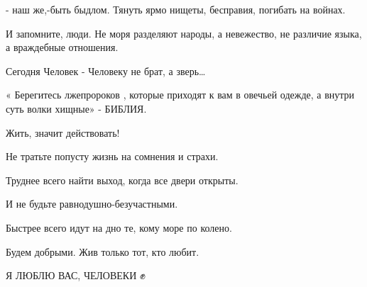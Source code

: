 - наш  же,-быть быдлом.  Тянуть ярмо нищеты, бесправия, погибать на войнах.

И запомните, люди. Не моря разделяют народы, а невежество, не различие языка,
а враждебные отношения. 

Сегодня Человек - Человеку не брат, а зверь…

\obeycr
« Берегитесь лжепророков , 
которые приходят к вам в овечьей одежде, 
а внутри суть волки хищные» - БИБЛИЯ.
\restorecr

Жить, значит действовать! 

Не тратьте попусту жизнь на сомнения и страхи.

Труднее всего найти выход, когда все двери открыты.

И не будьте равнодушно-безучастными. 

Быстрее всего идут на дно те, кому море по колено.

Будем добрыми. Жив только тот, кто любит.

Я ЛЮБЛЮ ВАС, ЧЕЛОВЕКИ ✊


